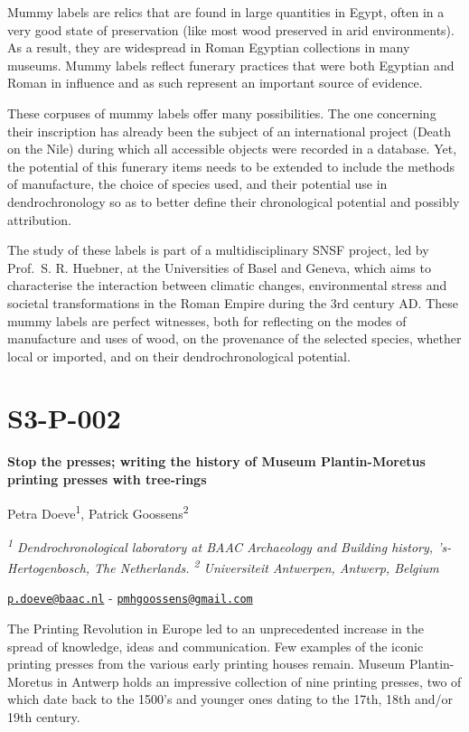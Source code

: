 \documentclass[
]{book}
\begin{document}
Mummy labels are relics that are found in large quantities in Egypt, often in a very good state of preservation (like most wood preserved in arid environments). As a result, they are widespread in Roman Egyptian collections in many museums. Mummy labels reflect funerary practices that were both Egyptian and Roman in influence and as such represent an important source of evidence.

These corpuses of mummy labels offer many possibilities. The one concerning their inscription has already been the subject of an international project (Death on the Nile) during which all accessible objects were recorded in a database. Yet, the potential of this funerary items needs to be extended to include the methods of manufacture, the choice of species used, and their potential use in dendrochronology so as to better define their chronological potential and possibly attribution.

The study of these labels is part of a multidisciplinary SNSF project, led by Prof.~S. R. Huebner, at the Universities of Basel and Geneva, which aims to characterise the interaction between climatic changes, environmental stress and societal transformations in the Roman Empire during the 3rd century AD. These mummy labels are perfect witnesses, both for reflecting on the modes of manufacture and uses of wood, on the provenance of the selected species, whether local or imported, and on their dendrochronological potential.

\hypertarget{s3-p-002}{%
\section*{S3-P-002}\label{s3-p-002}}

\textbf{Stop the presses; writing the history of Museum Plantin-Moretus printing presses with tree-rings}

Petra Doeve\textsuperscript{1}, Patrick Goossens\textsuperscript{2}

\emph{\textsuperscript{1} Dendrochronological laboratory at BAAC Archaeology and Building history, 's-Hertogenbosch, The Netherlands. \textsuperscript{2} Universiteit Antwerpen, Antwerp, Belgium}

\href{mailto:p.doeve@baac.nl}{\nolinkurl{p.doeve@baac.nl}} - \href{mailto:pmhgoossens@gmail.com}{\nolinkurl{pmhgoossens@gmail.com}}

The Printing Revolution in Europe led to an unprecedented increase in the spread of knowledge, ideas and communication. Few examples of the iconic printing presses from the various early printing houses remain. Museum Plantin-Moretus in Antwerp holds an impressive collection of nine printing presses, two of which date back to the 1500's and younger ones dating to the 17th, 18th and/or 19th century.
\end{document}
